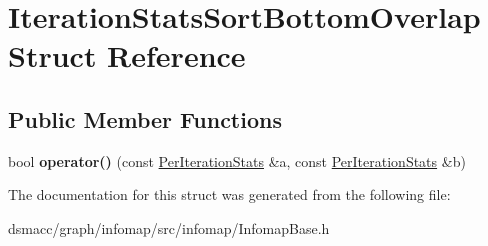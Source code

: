 \hypertarget{structIterationStatsSortBottomOverlap}{}\section{Iteration\+Stats\+Sort\+Bottom\+Overlap Struct Reference}
\label{structIterationStatsSortBottomOverlap}
\subsection*{Public Member Functions}
\begin{DoxyCompactItemize}
\item 
\mbox{\label{structIterationStatsSortBottomOverlap_a88d24cf928c905f0d34148ad63b3f4f4}} 
bool {\bfseries operator()} (const \mbox{\hyperlink{structPerIterationStats}{Per\+Iteration\+Stats}} \&a, const \mbox{\hyperlink{structPerIterationStats}{Per\+Iteration\+Stats}} \&b)
\end{DoxyCompactItemize}


The documentation for this struct was generated from the following file\+:\begin{DoxyCompactItemize}
\item 
dsmacc/graph/infomap/src/infomap/Infomap\+Base.\+h\end{DoxyCompactItemize}
